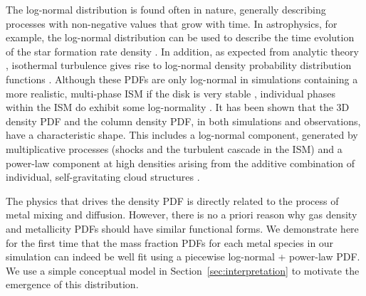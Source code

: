 \documentclass[twocolumn]{aastex61}
\begin{document}
The log-normal distribution is found often in nature, generally describing processes with non-negative values that grow with time. In astrophysics, for example, the log-normal distribution can be used to describe the time evolution of the star formation rate density \citep[see ][]{Gladders2013,Abramson2016,Diemer2017}. In addition, as expected from analytic theory \citep{Vazquez-Semadeni1994}, isothermal turbulence gives rise to log-normal density probability distribution functions \citep[PDFs;][]{Padoan1997, Passot1998, Ostriker1999,PadoanNordlund2002,KrumholzMcKee2005,Federrath2008}. Although these PDFs are only log-normal in simulations containing a more realistic, multi-phase ISM \citep{Scalo1998} if the disk is very stable \citep{WadaNorman2007}, individual phases within the ISM do exhibit some log-normality \citep{Tasker2009, Tasker2011,Joung2009,PriceFederrathBrunt2011, HopkinsQuataertMurray2012}. It has been shown that the 3D density PDF and the column density PDF, in both simulations and observations, have a characteristic shape. This includes a log-normal component, generated by multiplicative processes (shocks and the turbulent cascade in the ISM) and a power-law component at high densities arising from the additive combination of individual, self-gravitating cloud structures \citep{Vazquez-Semadeni1994,Burkhart2009, FederrathKlessen2013, Collins2012, Myers2015, Burkhart2017, Chen2017}.

The physics that drives the density PDF is directly related to the process of metal mixing and diffusion. However, there is no a priori reason why gas density and metallicity PDFs should have similar functional forms. We demonstrate here for the first time that the mass fraction PDFs for each metal species in our simulation can indeed be well fit using a piecewise log-normal + power-law PDF. We use a simple conceptual model in Section~\ref{sec:interpretation} to motivate the emergence of this distribution.
\end{document}
